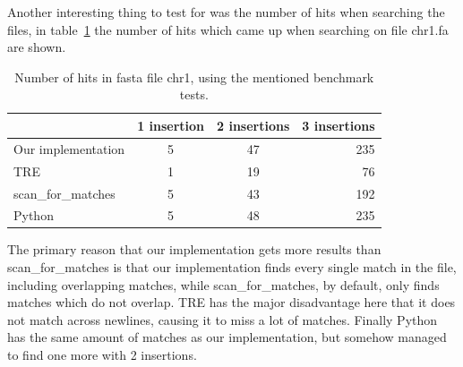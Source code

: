Another interesting thing to test for was the number of hits when searching the files, in table~\ref{tab:hits} the number of hits which came up when searching on file chr1.fa are shown.

\begin{table}[h!]
\centering
\begin{tabular}{ l | c c r }
& 1 insertion & 2 insertions & 3 insertions\\
\hline
Our implementation& 5 &  47 & 235 \\
TRE& 1 & 19 & 76 \\
scan\_for\_matches & 5 & 43  & 192 \\
Python & 5 & 48 & 235
\end{tabular}
\caption{Number of hits in fasta file chr1, using the mentioned benchmark tests.}
\label{tab:hits}
\end{table}

The primary reason that our implementation gets more results than scan\_for\_matches is that our implementation finds every single match in the file, including overlapping matches, while scan\_for\_matches, by default, only finds matches which do not overlap. TRE has the major disadvantage here that it does not match across newlines, causing it to miss a lot of matches. Finally Python has the same amount of matches as our implementation, but somehow managed to find one more with 2 insertions.